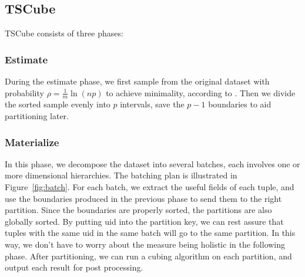\documentclass{article}
\begin{document}
\subsection{TSCube}

TSCube consists of three phases:

\subsubsection{Estimate}
During the estimate phase, we first sample from the original dataset with probability $\rho=\frac{1}{m}\ln(np)$ to achieve minimality, according to \cite{tao2013minimal}. Then we divide the sorted sample evenly into $p$ intervals, save the $p - 1$ boundaries to aid partitioning later.

\subsubsection{Materialize}
In this phase, we decompose the dataset into several batches, each involves one or more dimensional hierarchies. The batching plan is illustrated in Figure~\ref{fig:batch}. For each batch, we extract the useful fields of each tuple, and use the boundaries produced in the previous phase to send them to the right partition. Since the boundaries are properly sorted, the partitions are also globally sorted. By putting uid into the partition key, we can rest assure that tuples with the same uid in the same batch will go to the same partition. In this way, we don't have to worry about the measure being holistic in the following phase. After partitioning, we can run a cubing algorithm on each partition, and output each result for post processing.
\end{document}
